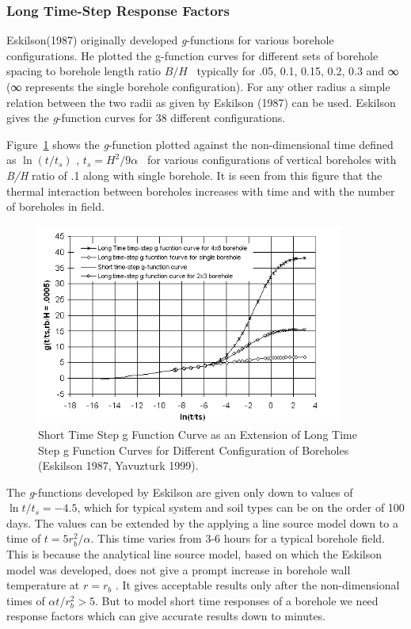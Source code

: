 \subsubsection{Long Time-Step Response Factors}\label{long-time-step-response-factors}

Eskilson(1987) originally developed \emph{g}-functions for various borehole configurations. He plotted the g-function curves for different sets of borehole spacing to borehole length ratio \(B/H\) ~typically for .05, 0.1, 0.15, 0.2, 0.3 and ∞ (∞ represents the single borehole configuration). For any other radius a simple relation between the two radii as given by Eskilson (1987) can be used. Eskilson gives the \emph{g}-function curves for 38 different configurations.

Figure~\ref{fig:short-time-step-g-function-curve-as-an} shows the \emph{g}-function plotted against the non-dimensional time defined as \(\ln (t/{t_s})\) , \({t_s} = {H^2}/9\alpha\) ~for various configurations of vertical boreholes with \emph{B/H} ratio of .1 along with single borehole. It is seen from this figure that the thermal interaction between boreholes increases with time and with the number of boreholes in field.

\begin{figure}[hbtp] %
\centering
\includegraphics[width=0.9\textwidth, height=0.9\textheight, keepaspectratio=true]{media/image5651.png}
\caption{Short Time Step g Function Curve as an Extension of Long Time Step g Function Curves for Different Configuration of Boreholes (Eskilson 1987, Yavuzturk 1999). \protect \label{fig:short-time-step-g-function-curve-as-an}}
\end{figure}

The \emph{g}-functions developed by Eskilson are given only down to values of $\ln t/t_s = -4.5$, which for typical system and soil types can be on the order of 100 days. The values can be extended by the applying a line source model down to a time of $t = 5r_b^2/\alpha$. This time varies from 3-6 hours for a typical borehole field. This is because the analytical line source model, based on which the Eskilson model was developed, does not give a prompt increase in borehole wall temperature at \(r = {r_b}\) . It gives acceptable results only after the non-dimensional times of \(\alpha t/r_b^2 > 5\). But to model short time responses of a borehole we need response factors which can give accurate results down to minutes.

